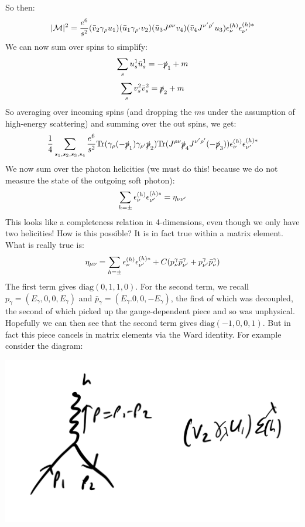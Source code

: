 So then:
\begin{equation}
    \lvert \mathcal{M} \rvert^2 = \frac{e^6}{s^2}(\bar{v}_2\gamma_\rho u_1)(\bar{u}_1\gamma_{\rho'}v_2)(\bar{u}_3J^{\rho\nu}v_4)(\bar{v}_4J^{\nu'\rho'}u_3)\epsilon^{(h)}_\nu \epsilon^{(h)*}_{\nu'}
\end{equation}
We can now sum over spins to simplify:
\begin{equation}
    \sum_s u^1_s \bar{u}_s^1 = -\slashed{p}_1 + m
\end{equation}
\begin{equation}
    \sum_s v_s^2 \bar{v}_s^2 = \slashed{p}_2 + m
\end{equation}
So averaging over incoming spins (and dropping the $m$s under the assumption of high-energy scattering) and summing over the out spins, we get:
\begin{equation}
    \frac{1}{4}\sum_{s_1, s_2, s_3, s_4}\frac{e^6}{s^2}\mathrm{Tr}(\gamma_\rho(-\slashed{p}_1)\gamma_{\rho'}\slashed{p}_2)\mathrm{Tr}(J^{\rho\nu}\slashed{p}_4J^{\nu'\rho'}(-\slashed{p}_3))\epsilon^{(h)}_\nu \epsilon^{(h)*}_{\nu'}
\end{equation}
We now sum over the photon helicities (we must do this! because we do not measure the state of the outgoing soft photon):
\begin{equation}
    \sum_{h=\pm}\epsilon^{(h)}_\nu \epsilon^{(h)*}_{\nu'} = \eta_{\nu\nu'}
\end{equation}
This looks like a completeness relation in 4-dimensions, even though we only have two helicities! How is this possible? It is in fact true within a matrix element. What is really true is:
\begin{equation}
    \eta_{\mu\nu} = \sum_{h=\pm}\epsilon^{(h)}_\nu \epsilon^{(h)*}_{\nu'} + C(p^\gamma_\nu\bar{p}^\gamma_{\nu'} + p^\gamma_{\nu'} \bar{p}^\gamma_{\nu})
\end{equation}
The first term gives $\text{diag}(0, 1, 1, 0)$. For the second term, we recall $p_\gamma = (E_\gamma, 0, 0, E_\gamma)$ and $\bar{p}_\gamma = (E_\gamma. 0, 0, -E_\gamma)$, the first of which was decoupled, the second of which picked up the gauge-dependent piece and so was unphysical. Hopefully we can then see that the second term gives $\text{diag}(-1, 0, 0, 1)$. But in fact this piece cancels in matrix elements via the Ward identity. For example consider the diagram:

\begin{center}
    \includegraphics[scale=0.35]{Lectures/Images/lec15-wardidentities.png}
\end{center}

